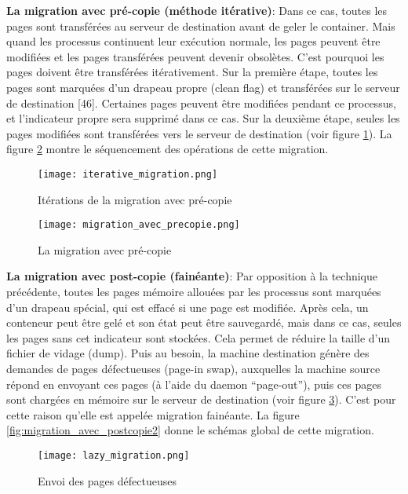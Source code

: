 \textbf{La migration avec pré-copie (méthode itérative)}: Dans ce cas, toutes les pages sont transférées au serveur de destination avant de geler le container. Mais quand les processus continuent leur exécution normale, les pages peuvent être modifiées et les pages transférées peuvent devenir obsolètes. C'est pourquoi les pages doivent être transférées itérativement. Sur la première étape, toutes les pages sont marquées d'un drapeau propre (clean flag) et transférées sur le serveur de destination [46]. Certaines pages peuvent être modifiées pendant ce processus, et l'indicateur propre sera supprimé dans ce cas. Sur la deuxième étape, seules les pages modifiées sont transférées vers le serveur de destination (voir figure \ref{fig:migration_avec_precopie1}). La figure \ref{fig:migration_avec_precopie2} montre le séquencement des opérations de cette migration.\par
\begin{figure}[H]
\centering
\texttt{[image: iterative\_migration.png]}
\caption{Itérations de la migration avec pré-copie \cite{mirkin2008}}
\label{fig:migration_avec_precopie1}
\end{figure}
\begin{figure}[H]
\centering
\texttt{[image: migration\_avec\_precopie.png]}
\caption{La migration avec pré-copie \cite{puliafito2019}}
\label{fig:migration_avec_precopie2}
\end{figure}
\textbf{La migration avec post-copie (fainéante)}: Par opposition à la technique précédente, toutes les pages mémoire allouées par les processus sont marquées d'un drapeau spécial, qui est effacé si une page est modifiée. Après cela, un conteneur peut être gelé et son état peut être sauvegardé, mais dans ce cas, seules les pages sans cet indicateur sont stockées. Cela permet de réduire la taille d'un fichier de vidage (dump). Puis au besoin, la machine destination génère des demandes de pages défectueuses (page-in swap), auxquelles la machine source répond en envoyant ces pages (à l'aide du daemon “page-out”), puis ces pages sont chargées en mémoire sur le serveur de destination (voir figure \ref{fig:migration_avec_postcopie1}). C'est pour cette raison qu'elle est appelée migration fainéante. La figure \ref{fig:migration_avec_postcopie2} donne le schémas global de cette migration.\par
\begin{figure}[H]
\centering
\texttt{[image: lazy\_migration.png]}
\caption{Envoi des pages défectueuses \cite{mirkin2008}}
\label{fig:migration_avec_postcopie1}
\end{figure}
